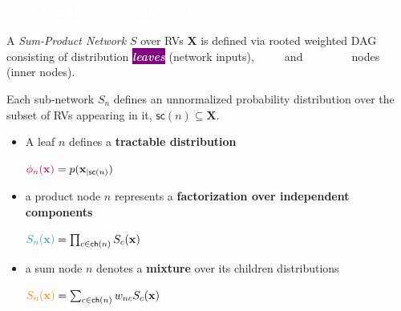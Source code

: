\documentclass[xcolor={usenames,dvipsnames,svgnames}, compress]{beamer}
\newcommand{\highlight}[2][yellow]{\mathchoice%
  {\colorbox{#1}{\textcolor{white}{$\displaystyle{#2}$}}}%
  {\colorbox{#1}{\textcolor{white}{$\textstyle{#2}$}}}%
  {\colorbox{#1}{\textcolor{white}{$\scriptstyle{#2}$}}}%
  {\colorbox{#1}{\textcolor{white}{$\scriptscriptstyle{#2}$}}}}%
\newcommand{\highlighttext}[2][yellow]{{\colorbox{#1}{\textcolor{white}{#2}}}}
\begin{document}
  \begin{frame}[t]
    \frametitle{\highlighttext[tomato3]{Sum-Product Networks (SPNs)}}
    \footnotesize
      A \emph{Sum-Product Network} $S$ over RVs $\mathbf X$ is defined via
  rooted weighted DAG consisting of
  distribution \highlighttext[purple]{\emph{\textbf{leaves}}} (network inputs),  \highlighttext[gold2]{\emph{\textbf{sum}}} and \highlighttext[petroil2]{\emph{\textbf{product}}}
  nodes (inner nodes).

  \vspace{0.5 cm}

  Each sub-network $S_{n}$ defines an unnormalized probability
  distribution over the subset of RVs appearing in it, $\mathsf{sc}(n)\subseteq\mathbf X$.\par\bigskip
\begin{minipage}{0.63\textwidth}
\begin{itemize}
\item  A %
  leaf
  $n$ defines a \textbf{tractable distribution}\par

  \hfill ${\color{purple}\phi_{n}(\mathbf{x})}= p(\mathbf{x}_{|\mathsf{sc}(n)})$
\item a %
  product node
      $n$ represents a \textbf{factorization over independent
        components}\par
      \hfill${\color{petroil2}S_{n}(\mathbf{x})}=\prod_{c\in \mathsf{ch}(n)}S_{c}(\mathbf{x})$

  
\item a %
  sum node
    $n$  denotes a
    \textbf{mixture} over its children distributions%
    \par
    \hfill ${\color{gold2}S_{n}(\mathbf{x})}=\sum_{c\in \mathsf{ch}(n)}w_{nc}S_{c}(\mathbf{x})$
\end{itemize}



\end{minipage}
\end{frame}
\end{document}
